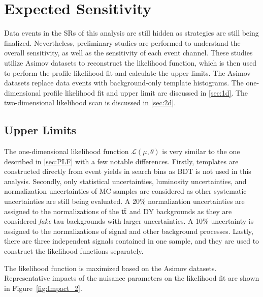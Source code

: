 \chapter{Expected Sensitivity}
\label{chap:Sensitivity}

Data events in the \acp{SR} of this analysis are still hidden as strategies are still being finalized. Nevertheless, preliminary studies are performed to understand the overall sensitivity, as well as the sensitivity of each event channel. These studies utilize Asimov datasets to reconstruct the likelihood function, which is then used to perform the profile likelihood fit and calculate the upper limits. The Asimov datasets replace data events with background-only template histograms. The one-dimensional profile likelihood fit and upper limit are discussed in \autoref{sec:1d}. The two-dimensional likelihood scan is discussed in \autoref{sec:2d}.

\section{Upper Limits}
\label{sec:1d}

The one-dimensional likelihood function $\mathcal{L}(\mu, \theta)$ is very similar to the one described in \autoref{sec:PLF} with a few notable differences. Firstly, templates are constructed directly from event yields in search bins as \ac{BDT} is not used in this analysis. Secondly, only statistical uncertainties, luminosity uncertainties, and normalization uncertainties of \ac{MC} samples are considered as other systematic uncertainties are still being evaluated. A 20\% normalization uncertainties are assigned to the normalizations of the $\textsf{t}\overline{\textsf{t}}$ and \ac{DY} backgrounds as they are considered \emph{fake} tau backgrounds with larger uncertainties. A 10\% uncertainty is assigned to the normalizations of signal and other background processes. Lastly, there are three independent signals contained in one sample, and they are used to construct the likelihood functions separately.

The likelihood function is maximized based on the Asimov datasets. Representative impacts of the nuisance parameters on the likelihood fit are shown in Figure~\ref{fig:Impact_2}.

